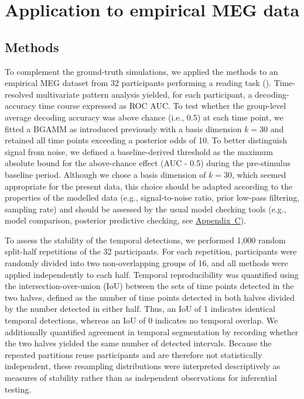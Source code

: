 \documentclass[
  doc,
  floatsintext,
  longtable,
  a4paper,
  nolmodern,
  notxfonts,
  notimes,
  colorlinks=true,linkcolor=blue,citecolor=blue,urlcolor=blue]{apa7}
\begin{document}
\section{Application to empirical MEG
data}\label{application-to-empirical-meg-data}

\subsection{Methods}\label{methods-1}

To complement the ground-truth simulations, we applied the methods to an
empirical MEG dataset from 32 participants performing a reading task
().
Time-resolved multivariate pattern analysis yielded, for each
participant, a decoding-accuracy time course expressed as ROC AUC. To
test whether the group-level average decoding accuracy was above chance
(i.e., 0.5) at each time point, we fitted a BGAMM as introduced
previously with a basis dimension \(k=30\) and retained all time points
exceeding a posterior odds of 10. To better distinguish signal from
noise, we defined a baseline-derived threshold as the maximum absolute
bound for the above-chance effect (AUC - 0.5) during the pre-stimulus
baseline period. Although we chose a basis dimension of \(k=30\), which
seemed appropriate for the present data, this choice should be adapted
according to the properties of the modelled data (e.g., signal-to-noise
ratio, prior low-pass filtering, sampling rate) and should be assessed
by the usual model checking tools (e.g., model comparison, posterior
predictive checking, see \hyperref[apx-basis]{Appendix~C}).

To assess the stability of the temporal detections, we performed 1,000
random split-half repetitions of the 32 participants. For each
repetition, participants were randomly divided into two non-overlapping
groups of 16, and all methods were applied independently to each half.
Temporal reproducibility was quantified using the
intersection-over-union (IoU) between the sets of time points detected
in the two halves, defined as the number of time points detected in both
halves divided by the number detected in either half. Thus, an IoU of 1
indicates identical temporal detections, whereas an IoU of 0 indicates
no temporal overlap. We additionally quantified agreement in temporal
segmentation by recording whether the two halves yielded the same number
of detected intervals. Because the repeated partitions reuse
participants and are therefore not statistically independent, these
resampling distributions were interpreted descriptively as measures of
stability rather than as independent observations for inferential
testing.
\end{document}
